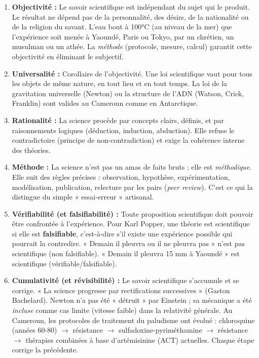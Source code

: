 \documentclass[11pt]{article}
\begin{document}
\begin{enumerate}
    \item \textbf{Objectivité :} Le savoir scientifique est indépendant du sujet qui le produit. Le résultat ne dépend pas de la personnalité, des désirs, de la nationalité ou de la religion du savant. L'eau bout à 100°C (au niveau de la mer) que l'expérience soit menée à Yaoundé, Paris ou Tokyo, par un chrétien, un musulman ou un athée. La \emph{méthode} (protocole, mesure, calcul) garantit cette objectivité en éliminant le subjectif.
    \item \textbf{Universalité :} Corollaire de l'objectivité. Une loi scientifique vaut pour tous les objets de même nature, en tout lieu et en tout temps. La loi de la gravitation universelle (Newton) ou la structure de l'ADN (Watson, Crick, Franklin) sont valides au Cameroun comme en Antarctique.
    \item \textbf{Rationalité :} La science procède par concepts clairs, définis, et par raisonnements logiques (déduction, induction, abduction). Elle refuse le contradictoire (principe de non-contradiction) et exige la cohérence interne des théories.
    \item \textbf{Méthode :} La science n'est pas un amas de faits bruts ; elle est \emph{méthodique}. Elle suit des règles précises : observation, hypothèse, expérimentation, modélisation, publication, relecture par les pairs (\emph{peer review}). C'est ce qui la distingue du simple « essai-erreur » artisanal.
    \item \textbf{Vérifiabilité (et falsifiabilité) :} Toute proposition scientifique doit pouvoir être confrontée à l'expérience. Pour Karl Popper, une théorie est scientifique si elle est \textbf{falsifiable}, c'est-à-dire s'il existe une expérience possible qui pourrait la contredire. « Demain il pleuvra ou il ne pleuvra pas » n'est pas scientifique (non falsifiable). « Demain il pleuvra 15 mm à Yaoundé » est scientifique (vérifiable/falsifiable).
    \item \textbf{Cumulativité (et révisibilité) :} Le savoir scientifique s'accumule et se corrige. « La science progresse par rectifications successives » (Gaston Bachelard). Newton n'a pas été « détruit » par Einstein ; sa mécanique a été \emph{incluse} comme cas limite (vitesse faible) dans la relativité générale. Au Cameroun, les protocoles de traitement du paludisme ont évolué : chloroquine (années 60-80) $\to$ résistance $\to$ sulfadoxine-pyriméthamine $\to$ résistance $\to$ thérapies combinées à base d'artémisinine (ACT) actuelles. Chaque étape corrige la précédente.
\end{enumerate}
\end{document}
